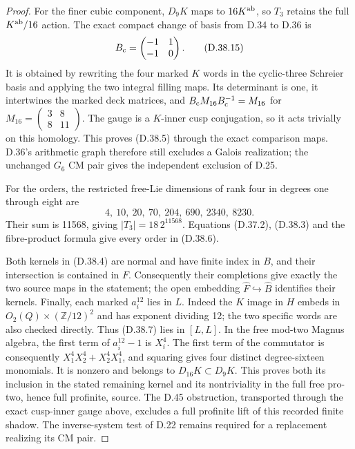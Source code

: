\begin{proof}
For the finer cubic component, $D_9K$ maps to
$16K^{\rm ab}$, so $T_3$ retains the full
$K^{\rm ab}/16$ action. The exact compact change of
basis from D.34 to D.36 is
\[
 B_{\rm c}=\begin{pmatrix}-1&1\\-1&0\end{pmatrix}.
                                                               \tag{D.38.15}
\]
It is obtained by rewriting the four marked $K$
words in the cyclic-three Schreier basis and
applying the two integral filling maps. Its
determinant is one, it intertwines the marked
deck matrices, and
$B_{\rm c}M_{16}B_{\rm c}^{-1}=M_{16}$ for
$M_{16}=\left(\begin{smallmatrix}3&8\\8&11\end{smallmatrix}\right)$.
The gauge is a $K$-inner cusp conjugation, so it acts
trivially on this homology. This proves (D.38.5)
through the exact comparison maps. D.36's arithmetic
graph therefore still excludes a Galois realization;
the unchanged $G_6$ CM pair gives the independent
exclusion of D.25.

For the orders, the restricted free-Lie dimensions
of rank four in degrees one through eight are
\[
 4,\ 10,\ 20,\ 70,\ 204,\ 690,\ 2340,\ 8230.
\]
Their sum is 11568, giving $|T_3|=18\,2^{11568}$.
Equations (D.37.2), (D.38.3) and the fibre-product
formula give every order in (D.38.6).

Both kernels in (D.38.4) are normal and have finite
index in $B$, and their intersection is contained in $F$.
Consequently their completions give exactly the two
source maps in the statement; the open embedding
$\widehat F\hookrightarrow\widehat B$ identifies their
kernels. Finally, each marked $a_i^{12}$ lies in $L$.
Indeed the $K$ image in $H$ embeds in
$O_2(Q)\times(\mathbb Z/12)^2$ and has exponent
dividing 12; the two specific words are also
checked directly. Thus (D.38.7) lies in $[L,L]$.
In the free mod-two Magnus algebra, the first term
of $a_i^{12}-1$ is $X_i^4$. The first term of the
commutator is consequently
$X_1^4X_2^4+X_2^4X_1^4$, and squaring gives four
distinct degree-sixteen monomials. It is nonzero
and belongs to $D_{16}K\subset D_9K$. This proves
both its inclusion in the stated remaining kernel
and its nontriviality in the full free pro-two,
hence full profinite, source. The D.45 obstruction, transported
through the exact cusp-inner gauge above, excludes a full profinite
lift of this recorded finite shadow. The inverse-system test of
D.22 remains required for a replacement realizing its CM pair.
\end{proof}
